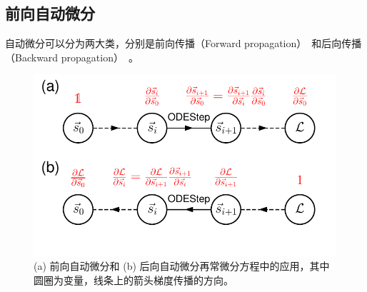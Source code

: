\documentclass[A4,twoside,fontset=ubuntu,UTF8]{ctexart}
\begin{document}
\subsection{前向自动微分}
    自动微分可以分为两大类，分别是前向传播（Forward propagation）~\cite{Wengert1964}和后向传播（Backward propagation）~\cite{Boltyanski1960}。
    \begin{figure}[t]
        \centering
        \includegraphics[width=0.7\columnwidth,trim={0 0cm 0 0},clip]{fig3.pdf}

        \caption{(a) 前向自动微分和 (b) 后向自动微分再常微分方程中的应用，其中圆圈为变量，线条上的箭头梯度传播的方向。}\label{fig:autodifftypes} 
\end{figure}
\end{document}
